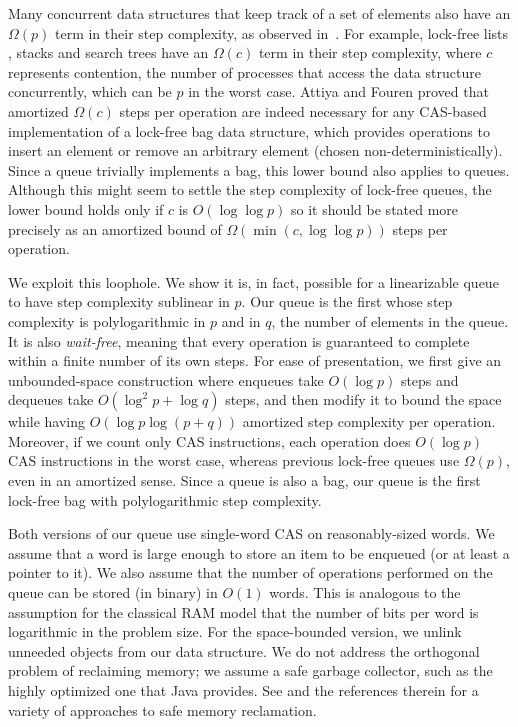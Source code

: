 Many concurrent data structures that keep track of a set of elements also have an $\Omega(p)$ term in their step complexity, as observed in~\cite{Rup16}.
For example, lock-free lists \cite{FR04,Sha15}, stacks \cite{Tre86} and search trees \cite{EFHR14} 
have an $\Omega(c)$ term in their step complexity, where $c$ represents contention,
the number of processes that access the data structure concurrently, which can be $p$ in the worst case.
Attiya and Fouren \cite{DBLP:conf/opodis/AttiyaF17} proved 
that amortized $\Omega(c)$ steps per operation are indeed necessary
for any CAS-based implementation of a lock-free bag data structure, which provides operations
to insert an element or remove an arbitrary element (chosen non-deterministically).
Since a queue trivially implements a bag, this lower bound also applies to queues.
Although this might seem to settle the step complexity of lock-free queues, the lower bound
holds only if $c$ is $O(\log\log p)$ so it should be stated more precisely as
an amortized bound of $\Omega(\min(c,\log\log p))$ steps per operation.

We exploit this loophole.  We show  it is, in fact, possible for a linearizable queue
to have step complexity sublinear in $p$.
Our queue is the first whose step complexity  is polylogarithmic in $p$ and in $q$, the number of elements in the queue.
It is also \emph{wait-free}, meaning that every operation is guaranteed to complete within a finite number of its own steps.
For ease of presentation, we first give an unbounded-space construction where enqueues take $O(\log p)$ steps and
dequeues take $O(\log^2 p + \log q)$ steps,
and then modify it to bound the space
while  having $O(\log p\log( p+ q))$ amortized step complexity  per operation.
Moreover, if we count only CAS instructions, each operation does $O(\log p)$ CAS instructions in the worst case, whereas previous
lock-free queues use 
$\Omega(p)$, even in an amortized sense.
Since a queue is also a bag, our queue is the first lock-free bag  with polylogarithmic step complexity.

Both versions of our queue use single-word CAS on reasonably-sized 
words.
We assume that a word is large enough to store an item to be enqueued (or at least a pointer to it).  We also assume that the number of operations performed on the queue can be stored (in binary) in $O(1)$ words.
This is analogous to the assumption for the classical RAM model that the number of bits per word is logarithmic in the problem size.
For the space-bounded version, we unlink unneeded objects from our data structure.
We do not address the orthogonal problem of reclaiming memory; we assume a safe
garbage collector, such as the highly optimized one that Java provides.
See \cite{SBM24} and the references therein for a variety of approaches to
safe memory reclamation.


